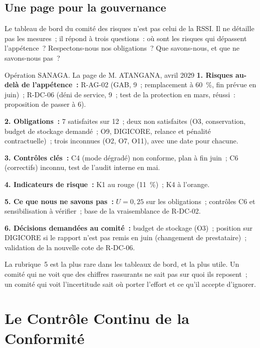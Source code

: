 \subsection{Une page pour la gouvernance}

Le tableau de bord du comité des risques n'est pas celui de la RSSI. Il ne
détaille pas les mesures~; il répond à trois questions~: où sont les risques
qui dépassent l'appétence~? Respectons-nous nos obligations~? Que
savons-nous, et que ne savons-nous pas~?

\begin{boxscenario}{Opération SANAGA. La page de M. ATANGANA, avril 2029}
\textbf{1. Risques au-delà de l'appétence~:} R-AG-02 (GAB, 9~; remplacement
à 60~\%, fin prévue en juin)~; R-DC-06 (déni de service, 9~; test de la
protection en mars, réussi~: proposition de passer à 6).

\medskip
\textbf{2. Obligations~:} 7 satisfaites sur 12~; deux non satisfaites (O3,
conservation, budget de stockage demandé~; O9, DIGICORE, relance et
pénalité contractuelle)~; trois inconnues (O2, O7, O11), avec une date pour
chacune.

\medskip
\textbf{3. Contrôles clés~:} C4 (mode dégradé) non conforme, plan à fin
juin~; C6 (correctifs) inconnu, test de l'audit interne en mai.

\medskip
\textbf{4. Indicateurs de risque~:} K1 au rouge (11~\%)~; K4 à l'orange.

\medskip
\textbf{5. Ce que nous ne savons pas~:} $U = 0{,}25$ sur les obligations~;
contrôles C6 et sensibilisation à vérifier~; base \NEK{} de la vraisemblance
de R-DC-02.

\medskip
\textbf{6. Décisions demandées au comité~:} budget de stockage (O3)~;
position sur DIGICORE si le rapport n'est pas remis en juin (changement de
prestataire)~; validation de la nouvelle cote de R-DC-06.
\end{boxscenario}

La rubrique~5 est la plus rare dans les tableaux de bord, et la plus
utile. Un comité qui ne voit que des chiffres rassurants ne sait pas sur
quoi ils reposent~; un comité qui voit l'incertitude sait où porter
l'effort et ce qu'il accepte d'ignorer.

\section{Le Contrôle Continu de la Conformité}
\label{sec:c13-continu}

